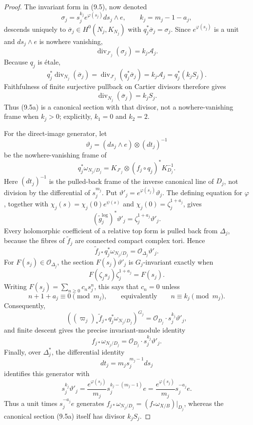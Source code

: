 \begin{proof}
The invariant form in (9.5), now denoted
\[
 \sigma_j=s_j^{k_j}e^{\varphi(s_j)}ds_j\wedge e,
 \qquad k_j=m_j-1-a_j,
\tag{9.5a}
\]
descends uniquely to
\(\overline\sigma_j\in H^0(N_j,K_{N_j})\) with
\(q_j^*\overline\sigma_j=\sigma_j\).  Since \(e^{\varphi(s_j)}\) is a
unit and \(ds_j\wedge e\) is nowhere vanishing,
\[
 \operatorname{div}_{J'_j}(\sigma_j)=k_j\mathcal A_j.
\]
Because \(q_j\) is \'etale,
\[
 q_j^*\operatorname{div}_{N_j}(\overline\sigma_j)
 =\operatorname{div}_{J'_j}(q_j^*\overline\sigma_j)
 =k_j\mathcal A_j=q_j^*(k_jS_j).
\]
Faithfulness of finite surjective pullback on Cartier divisors therefore gives
\[
 \operatorname{div}_{N_j}(\overline\sigma_j)=k_jS_j.
\tag{9.5b}
\]
Thus (9.5a) is a canonical section with that divisor, not a nowhere-vanishing
frame when \(k_j>0\); explicitly, \(k_1=0\) and \(k_2=2\).

For the direct-image generator, let
\[
 \vartheta_j=(ds_j\wedge e)\otimes(dt_j)^{-1}
\tag{9.5c}
\]
be the nowhere-vanishing frame of
\[
 q_j^*\omega_{N_j/D_j}
 =K_{J'_j}\otimes(f_j\circ q_j)^*K_{D_j}^{-1}.
\]
Here \((dt_j)^{-1}\) is the pulled-back frame of the inverse canonical line
of \(D_j\), not division by the differential of \(s_j^{m_j}\).  Put
\(\vartheta'_j=e^{\varphi(s_j)}\vartheta_j\).  The defining equation for
\(\varphi\), together with
\(\chi_j(s)=\chi_j(0)e^{\psi(s)}\) and
\(\chi_j(0)=\zeta_j^{1+a_j}\), gives
\[
 (\widetilde g_j^{\log})^*\vartheta'_j
 =\zeta_j^{1+a_j}\vartheta'_j.
\tag{9.5d}
\]
Every holomorphic coefficient of a relative top form is pulled back from
\(\Delta_j\), because the fibres of \(\widetilde f_j\) are connected compact
complex tori.  Hence
\[
 \widetilde f_{j*}q_j^*\omega_{N_j/D_j}
 =\mathcal O_{\Delta_j}\vartheta'_j.
\]
For \(F(s_j)\in\mathcal O_{\Delta_j}\), the section
\(F(s_j)\vartheta'_j\) is \(G_j\)-invariant exactly when
\[
 F(\zeta_js_j)\zeta_j^{1+a_j}=F(s_j).
\tag{9.5e}
\]
Writing \(F(s_j)=\sum_{n\ge0}c_ns_j^n\), this says that \(c_n=0\) unless
\[
 n+1+a_j\equiv0\pmod {m_j},
 \qquad\text{equivalently}\qquad n\equiv k_j\pmod {m_j}.
\]
Consequently,
\[
 \left((\varpi_j)_*\widetilde f_{j*}
 q_j^*\omega_{N_j/D_j}\right)^{G_j}
 =\mathcal O_{D_j}\cdot s_j^{k_j}\vartheta'_j,
\]
and finite descent gives the precise invariant-module identity
\[
 f_{j*}\omega_{N_j/D_j}
 =\mathcal O_{D_j}\cdot s_j^{k_j}\vartheta'_j.
\tag{9.5f}
\]
Finally, over \(\Delta_j^*\), the differential identity
\[
 dt_j=m_js_j^{m_j-1}ds_j
\]
identifies this generator with
\[
 s_j^{k_j}\vartheta'_j
 =\frac{e^{\varphi(s_j)}}{m_j}
 s_j^{k_j-(m_j-1)}e
 =\frac{e^{\varphi(s_j)}}{m_j}s_j^{-a_j}e.
\tag{9.5g}
\]
Thus a unit times \(s_j^{-a_j}e\) generates
\(f_{j*}\omega_{N_j/D_j}=(f_*\omega_{X/B})|_{D_j}\), whereas the
canonical section (9.5a) itself has divisor \(k_jS_j\).


\end{proof}
